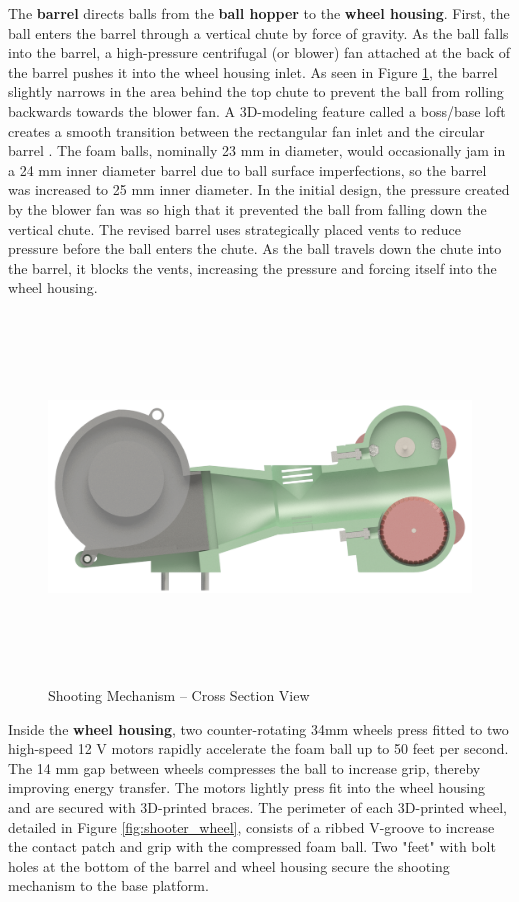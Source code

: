 The \textbf{barrel} directs balls from the \textbf{ball hopper} to the \textbf{wheel housing}. First, the ball enters the barrel through a vertical chute by force of gravity. As the ball falls into the barrel, a high-pressure centrifugal (or blower) fan attached at the back of the barrel pushes it into the wheel housing inlet. As seen in Figure \ref{fig:shooter_xsec}, the barrel slightly narrows in the area behind the top chute to prevent the ball from rolling backwards towards the blower fan. A 3D-modeling feature called a boss/base loft creates a smooth transition between the rectangular fan inlet and the circular barrel \cite{zuyderduyn_2016}. The foam balls, nominally 23 mm in diameter, would occasionally jam in a 24 mm inner diameter barrel due to ball surface imperfections, so the barrel was increased to 25 mm inner diameter. In the initial design, the pressure created by the blower fan was so high that it prevented the ball from falling down the vertical chute. The revised barrel uses strategically placed vents to reduce pressure before the ball enters the chute. As the ball travels down the chute into the barrel, it blocks the vents, increasing the pressure and forcing itself into the wheel housing.

\begin{figure}[H]   %
	\centering \includegraphics[width=6in, height=3.85in, keepaspectratio]{figures/shooter_xsec.png}
	\caption{Shooting Mechanism -- Cross Section View}	\label{fig:shooter_xsec}
\end{figure}

Inside the \textbf{wheel housing}, two counter-rotating 34mm wheels press fitted to two high-speed 12 V motors rapidly accelerate the foam ball up to 50 feet per second. The 14 mm gap between wheels compresses the ball to increase grip, thereby improving energy transfer. The motors lightly press fit into the wheel housing and are secured with 3D-printed braces. The perimeter of each 3D-printed wheel, detailed in Figure \ref{fig:shooter_wheel}, consists of a ribbed V-groove to increase the contact patch and grip with the compressed foam ball. Two "feet" with bolt holes at the bottom of the barrel and wheel housing secure the shooting mechanism to the base platform.

